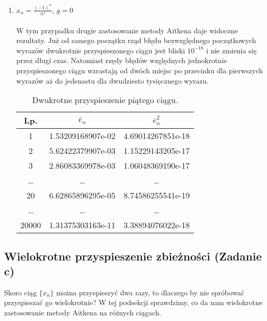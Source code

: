 \documentclass{article}
\begin{document}
\begin{enumerate}
\item $x_n = \frac{(-1)^n}{n^4}$, $g = 0$ \\ \\
W tym przypadku drugie zastosowanie metody Aitkena daje widoczne rezultaty. Już od samego początku rząd błędu bezwzględnego początkowych wyrazów dwukrotnie przyspieszonego ciągu jest bliski $10^{-18}$ i nie zmienia się przez długi czas. Natomiast rzędy błędów względnych jednokrotnie przyspieszonego ciągu wzrastają od dwóch miejsc po przecinku dla pierwszych wyrazów aż do jedenastu dla dwudziesto tysięcznego wyrazu.
\begin{table}[h]
\centering
\begin{tabular}[c]{|c|c|c|}
\hline
\textbf{Lp.} & $\bar{e}_n$ & $\bar{e}_n^2$ \\
\hline
1 & 
1.53209168907e-02  &
4.69014267851e-18 \\
\hline
2 &
5.62422379907e-03 & 
1.15229143205e-17 \\
\hline
3 &
2.86083369978e-03 &
1.06048369190e-17 \\
\hline
\dots & \ldots & \ldots \\
\hline
20 &
6.62865896295e-05 &
8.74586255541e-19 \\
\hline
\dots & \ldots & \ldots \\
\hline
20000 &
1.31375303163e-11 &
3.38894076022e-18 \\
\hline
\end{tabular}
\caption{Dwukrotne przyspieszenie piątego ciągu.}
\end{table}

\end{enumerate}

\subsection{Wielokrotne przyspieszenie zbieżności (Zadanie c)}
Skoro ciąg $\{x_n\}$ można przyspieszyć dwa razy, to dlaczego by nie spróbować przyspieszać go wielokrotnie? 
W tej podsekcji sprawdzimy, co da nam wielokrotne zastosowanie metody Aitkena na różnych ciągach.
\end{document}
